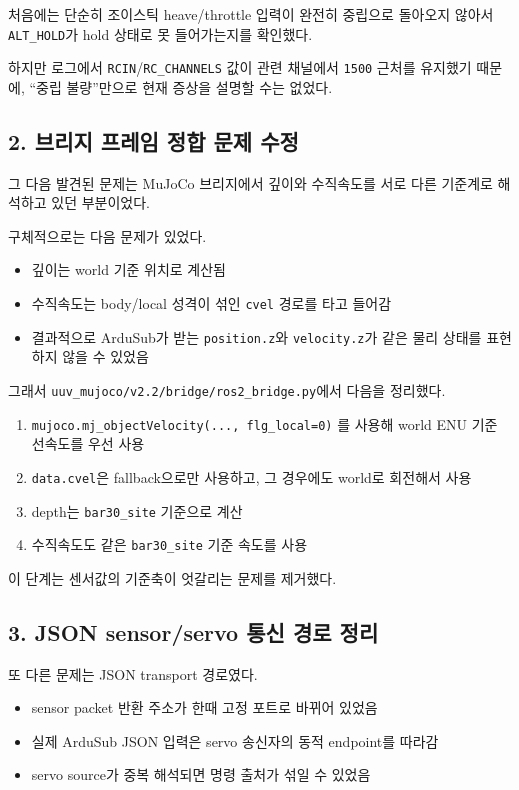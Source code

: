 \documentclass[11pt]{article}
\begin{document}
처음에는 단순히 조이스틱 heave/throttle 입력이 완전히 중립으로
돌아오지 않아서 \texttt{ALT\_HOLD}가 hold 상태로 못 들어가는지를 확인했다.

하지만 로그에서 \texttt{RCIN}/\texttt{RC\_CHANNELS} 값이 관련 채널에서
\texttt{1500} 근처를 유지했기 때문에, ``중립 불량''만으로 현재 증상을
설명할 수는 없었다.

\subsection{2. 브리지 프레임 정합 문제 수정}

그 다음 발견된 문제는 MuJoCo 브리지에서 깊이와 수직속도를 서로 다른
기준계로 해석하고 있던 부분이었다.

구체적으로는 다음 문제가 있었다.

\begin{itemize}[leftmargin=1.5em]
\item 깊이는 world 기준 위치로 계산됨
\item 수직속도는 body/local 성격이 섞인 \texttt{cvel} 경로를 타고 들어감
\item 결과적으로 ArduSub가 받는 \texttt{position.z}와 \texttt{velocity.z}가
      같은 물리 상태를 표현하지 않을 수 있었음
\end{itemize}

그래서 \texttt{uuv\_mujoco/v2.2/bridge/ros2\_bridge.py}에서 다음을 정리했다.

\begin{enumerate}[leftmargin=1.5em]
\item \texttt{mujoco.mj\_objectVelocity(..., flg\_local=0)} 를 사용해
      world ENU 기준 선속도를 우선 사용
\item \texttt{data.cvel}은 fallback으로만 사용하고, 그 경우에도 world로 회전해서 사용
\item depth는 \texttt{bar30\_site} 기준으로 계산
\item 수직속도도 같은 \texttt{bar30\_site} 기준 속도를 사용
\end{enumerate}

이 단계는 센서값의 기준축이 엇갈리는 문제를 제거했다.

\subsection{3. JSON sensor/servo 통신 경로 정리}

또 다른 문제는 JSON transport 경로였다.

\begin{itemize}[leftmargin=1.5em]
\item sensor packet 반환 주소가 한때 고정 포트로 바뀌어 있었음
\item 실제 ArduSub JSON 입력은 servo 송신자의 동적 endpoint를 따라감
\item servo source가 중복 해석되면 명령 출처가 섞일 수 있었음
\end{itemize}
\end{document}

